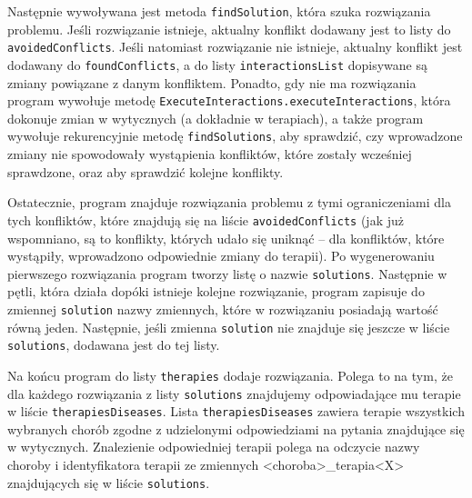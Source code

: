 Następnie wywoływana jest metoda \texttt{findSolution}, która szuka rozwiązania problemu. Jeśli rozwiązanie istnieje, aktualny konflikt dodawany jest to listy do \texttt{avoided\-Conflicts}. Jeśli natomiast rozwiązanie nie istnieje, aktualny konflikt jest dodawany do \texttt{foundConflicts}, a do listy \texttt{interactionsList} dopisywane są zmiany powiązane z danym konfliktem. Ponadto, gdy nie ma rozwiązania program wywołuje metodę \texttt{ExecuteInteractions.execute\-Interactions}, która dokonuje zmian w wytycznych (a dokładnie w terapiach), a także program wywołuje rekurencyjnie metodę \texttt{findSolutions}, aby sprawdzić, czy wprowadzone zmiany nie spowodowały wystąpienia konfliktów, które zostały wcześniej sprawdzone, 
oraz aby sprawdzić kolejne konflikty. 

Ostatecznie, program znajduje rozwiązania problemu z tymi ograniczeniami dla tych konfliktów, które znajdują się na liście \texttt{avoidedConflicts} (jak już wspomniano, są to konflikty, których udało się uniknąć -- dla konfliktów, które wystąpiły, wprowadzono odpowiednie zmiany do terapii). Po wygenerowaniu pierwszego rozwiązania program tworzy listę o nazwie \texttt{solutions}. Następnie w pętli, która działa dopóki istnieje kolejne rozwiązanie, program zapisuje do zmiennej \texttt{solution} nazwy zmiennych, które w rozwiązaniu posiadają wartość równą jeden. Następnie, jeśli zmienna \texttt{solution} nie znajduje się jeszcze w liście \texttt{solutions}, dodawana jest do tej listy. 



Na końcu program do listy \texttt{therapies} dodaje rozwiązania. Polega to na tym, że dla każdego rozwiązania z listy \texttt{solutions} znajdujemy odpowiadające mu terapie w liście \texttt{therapiesDiseases}. Lista \texttt{therapiesDiseases} zawiera terapie wszystkich wybranych chorób zgodne z udzielonymi odpowiedziami na pytania znajdujące się w wytycznych. Znalezienie odpowiedniej terapii polega na odczycie nazwy choroby i identyfikatora terapii ze zmiennych <choroba>\_terapia<X> znajdujących się w liście \texttt{solutions}.

